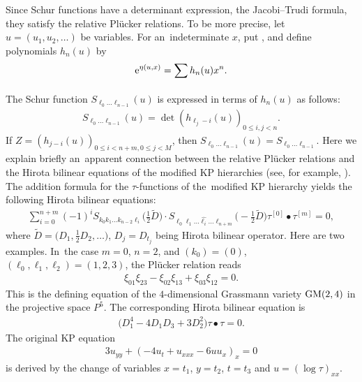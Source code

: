 \documentclass[pdftex]{sigma}
\numberwithin{equation}{section}
\begin{document}
Since Schur functions have a determinant expression, the Jacobi--Trudi formula, they satisfy the relative Pl\"ucker relations. To be more precise, let $u=(u_1,u_2,\dots)$ be variables. For an~indeterminate $x$, put , and define polynomials $h_n(u)$ by
\begin{gather*}
{\rm e}^{\eta(u,x)}=\sum_{}h_{n}(u)x^n.
\end{gather*}
The Schur function $S_{\ell_0 \dots \ell_{n-1}}(u)$ is expressed in terms of $h_{n}(u)$ as follows:
\begin{gather*}
S_{\ell_0 \dots \ell_{n-1}}(u)=\det{(h_{\ell_{j}-i}(u))}_{0\leq i,j<n}.
\end{gather*}
If $Z=(h_{j-i}(u))_{0\leq i <n+m, 0\leq j < M}$, then $S_{\ell_0 \dots \ell_{n-1}}(u)=S_{\ell_0 \dots \ell_{n-1}}$.
Here we explain briefly an~apparent connection between the relative Pl\"ucker relations and the Hirota bilinear equations of the modified KP hierarchies (see, for example, \cite{ostt}). The addition formula for the $\tau$-functions of the~modified KP hierarchy yields the following Hirota bilinear equations:
\begin{gather*}
\sum_{i=0}^{n+m}{(-1)}^{i}S_{k_0 k_1 \dots k_{n-2} \ell_i}\biggl(\frac{1}{2}\widetilde{D}\biggr)\cdot S_{\ell_0 \ell_1 \dots \widehat{\ell_i} \dots \ell_{n+m}}\biggl(-\frac{1}{2}\widetilde{D}\biggr)\tau^{[0]}\bullet \tau^{[m]}=0,
\end{gather*}
where $\widetilde{D} = \bigl(D_1, \frac{1}{2}D_2, \dots\bigr)$, $D_j = D_{t_j}$ being Hirota bilinear operator.
Here are two examples. In~the case $m=0$, $n=2$, and $(k_0) = (0)$, $(\ell_0,\ell_1, \ell_2)=(1,2,3)$, the Pl\"ucker relation reads
\begin{gather*}
\xi_{01}\xi_{23} - \xi_{02}\xi_{13} + \xi_{03}\xi_{12} = 0.
\end{gather*}
This is the defining equation of the $4$-dimensional Grassmann variety ${\rm GM}(2,4)$ in the projective space $P^5$.
The corresponding Hirota bilinear equation is
\begin{gather*}
\bigl(D_1^4 - 4D_1D_3 + 3D_2^2\bigr)\tau\bullet \tau =0.
\end{gather*}
The original KP equation
\begin{gather*}
3u_{yy} + (-4u_t + u_{xxx} -6uu_x)_x =0
\end{gather*}
is derived by the change of variables $x=t_1$, $y=t_2$, $t=t_3$ and $u=(\log \tau)_{xx}$.
\end{document}
